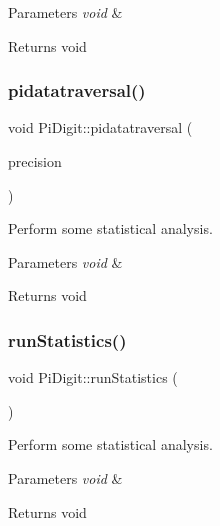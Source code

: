 \begin{DoxyParams}{Parameters}
{\em void} & \\
\hline
\end{DoxyParams}
\begin{DoxyReturn}{Returns}
void 
\end{DoxyReturn}
\mbox{\label{classPiDigit_a65472a23d6e66b78e2101e67cc24b03a}} 
\subsubsection{\texorpdfstring{pidatatraversal()}{pidatatraversal()}}
{\footnotesize\ttfamily void Pi\+Digit\+::pidatatraversal (\begin{DoxyParamCaption}\item[{unsigned int}]{precision }\end{DoxyParamCaption})\hspace{0.3cm}{\ttfamily [inline]}}



Perform some statistical analysis. 


\begin{DoxyParams}{Parameters}
{\em void} & \\
\hline
\end{DoxyParams}
\begin{DoxyReturn}{Returns}
void 
\end{DoxyReturn}
\mbox{\label{classPiDigit_a015de54a634ef5657639269d02668927}} 
\subsubsection{\texorpdfstring{run\+Statistics()}{runStatistics()}}
{\footnotesize\ttfamily void Pi\+Digit\+::run\+Statistics (\begin{DoxyParamCaption}\item[{void}]{ }\end{DoxyParamCaption})\hspace{0.3cm}{\ttfamily [virtual]}}



Perform some statistical analysis. 


\begin{DoxyParams}{Parameters}
{\em void} & \\
\hline
\end{DoxyParams}
\begin{DoxyReturn}{Returns}
void 
\end{DoxyReturn}


